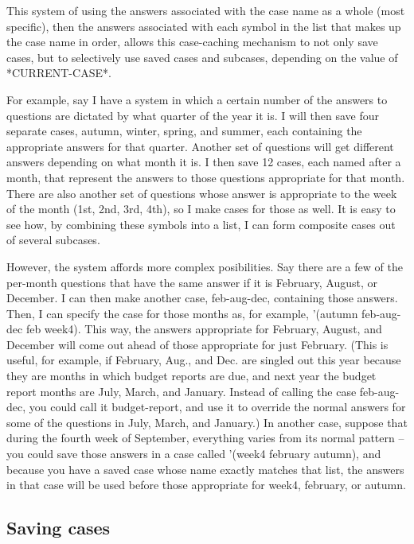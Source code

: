 This system of using the answers associated with the case name as a
whole (most specific), then the answers associated with each symbol in
the list that makes up the case name in order, allows this
case-caching mechanism to not only save cases, but to selectively use
saved cases and subcases, depending on the value of *CURRENT-CASE*.

For example, say I have a system in which a certain number of the
answers to questions are dictated by what quarter of the year it is. I
will then save four separate cases, autumn, winter, spring, and
summer, each containing the appropriate answers for that quarter.
Another set of questions will get different answers depending on what
month it is. I then save 12 cases, each named after a month, that
represent the answers to those questions appropriate for that month.
There are also another set of questions whose answer is appropriate
to the week of the month (1st, 2nd, 3rd, 4th), so I make cases for
those as well.  It is easy to see how, by combining these symbols into
a list, I can form composite cases out of several subcases.

However, the system affords more complex posibilities. Say there are a
few of the per-month questions that have the same answer if it is
February, August, or December. I can then make another case,
feb-aug-dec, containing those answers. Then, I can specify the case
for those months as, for example,  '(autumn feb-aug-dec feb week4).
This way, the answers appropriate for February, August, and December
will come out ahead of those appropriate for just February. (This is
useful, for example, if February, Aug., and Dec. are singled out this
year because they are months in which budget reports are due, and next
year the budget report months are July, March, and January. Instead of
calling the case feb-aug-dec, you could call it budget-report, and use
it to override the normal answers for some of the questions in July,
March, and January.) In another case, suppose that during the fourth
week of September, everything varies from its normal pattern -- you
could save those answers in a case called '(week4 february autumn),
and because you have a saved case whose name exactly matches that
list, the answers in that case will be used before those appropriate
for week4, february, or autumn.


\subsection{Saving cases}


